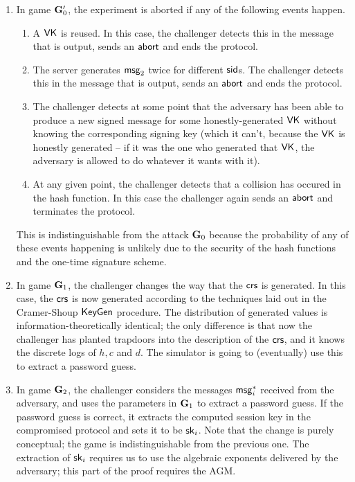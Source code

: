 \begin{enumerate}
	\item In game $\mathbf{G}_0'$, the experiment is aborted if any of the following events happen.
	\begin{enumerate}
		\item A $\mathsf{VK}$ is reused. In this case, the challenger detects this in the message that is output, sends an $\mathsf{abort}$ and ends the protocol.
		\item The server generates $\mathsf{msg}_{2}$ twice for different $\mathsf{sid}$s. The challenger detects this in the message that is output, sends an $\mathsf{abort}$ and ends the protocol.
		\item The challenger detects at some point that the adversary has been able to produce a new signed message for some honestly-generated $\mathsf{VK}$ without knowing the corresponding signing key (which it can't, because the $\mathsf{VK}$ is honestly generated -- if it was the one who generated that $\mathsf{VK}$, the adversary is allowed to do whatever it wants with it).
		\item At any given point, the challenger detects that a collision has occured in the hash function. In this case the challenger again sends an $\mathsf{abort}$ and terminates the protocol.
	\end{enumerate}
	This is indistinguishable from the attack $\mathbf{G}_0$ because the probability of any of these events happening is unlikely due to the security of the hash functions and the one-time signature scheme.
	
	\item In game $\mathbf{G}_1$, the challenger changes the way that the $\mathsf{crs}$ is generated. In this case, the $\mathsf{crs}$ is now generated according to the techniques laid out in the Cramer-Shoup $\mathsf{KeyGen}$ procedure. The distribution of generated values is information-theoretically identical; the only difference is that now the challenger has planted trapdoors into the description of the $\mathsf{crs}$, and it knows the discrete logs of $h, c$ and $d$. The simulator is going to (eventually) use this to extract a password guess.
	
	\item In game $\mathbf{G}_2$, the challenger considers the messages $\mathsf{msg}_{i}^{*}$ received from the adversary, and uses the parameters in $\mathbf{G}_1$ to extract a password guess. If the password guess is correct, it extracts the computed session key in the compromised protocol and sets it to be $\mathsf{sk}_i$. Note that the change is purely conceptual; the game is indistinguishable from the previous one. The extraction of $\mathsf{sk}_i$ requires us to use the algebraic exponents delivered by the adversary; this part of the proof requires the AGM.
	

\end{enumerate}
